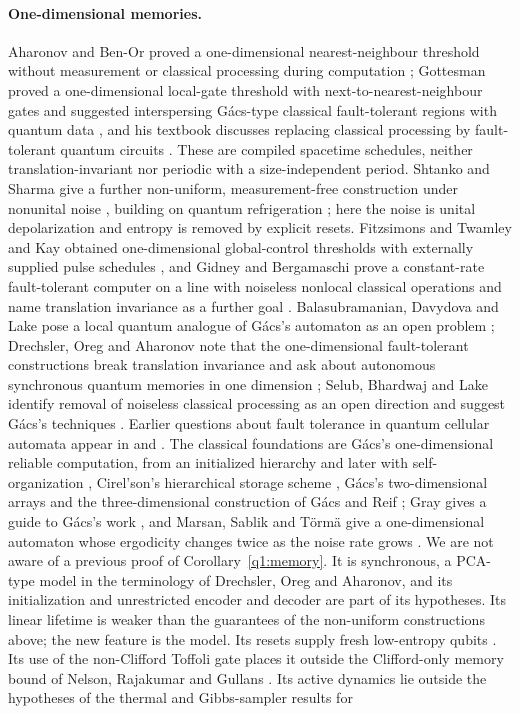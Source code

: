 \paragraph{One-dimensional memories.}
Aharonov and Ben-Or proved a one-dimensional nearest-neighbour threshold without measurement or classical processing during computation \cite[Theorem~13]{ABO2008}; Gottesman proved a one-dimensional local-gate threshold with next-to-nearest-neighbour gates and suggested interspersing G\'acs-type classical fault-tolerant regions with quantum data \cite{Gottesman2000}, and his textbook discusses replacing classical processing by fault-tolerant quantum circuits \cite[Section~15.3.1]{Gottesman2024}. These are compiled spacetime schedules, neither translation-invariant nor periodic with a size-independent period. Shtanko and Sharma give a further non-uniform, measurement-free construction under nonunital noise \cite{SS2025}, building on quantum refrigeration \cite{BGH2013}; here the noise is unital depolarization and entropy is removed by explicit resets. Fitzsimons and Twamley and Kay obtained one-dimensional global-control thresholds with externally supplied pulse schedules \cite{FT2007,Kay2007,Kay2005}, and Gidney and Bergamaschi prove a constant-rate fault-tolerant computer on a line with noiseless nonlocal classical operations and name translation invariance as a further goal \cite{GB2025}. Balasubramanian, Davydova and Lake pose a local quantum analogue of G\'acs's automaton as an open problem \cite{BDL2026}; Drechsler, Oreg and Aharonov note that the one-dimensional fault-tolerant constructions break translation invariance and ask about autonomous synchronous quantum memories in one dimension \cite[Sections~1.2 and~1.8]{DOA2026}; Selub, Bhardwaj and Lake identify removal of noiseless classical processing as an open direction and suggest G\'acs's techniques \cite[Section~1.3]{SBL2026}. Earlier questions about fault tolerance in quantum cellular automata appear in \cite[Section~IV]{Kay2007} and \cite[Section~10.1.2]{PerezDelgado2007}. The classical foundations are G\'acs's one-dimensional reliable computation, from an initialized hierarchy \cite{Gacs1986} and later with self-organization \cite{Gacs2001}, Cirel'son's hierarchical storage scheme \cite{Cirelson1978}, G\'acs's two-dimensional arrays \cite{Gacs1989} and the three-dimensional construction of G\'acs and Reif \cite{GacsReif1988}; Gray gives a guide to G\'acs's work \cite{Gray2001}, and Marsan, Sablik and T\"orm\"a give a one-dimensional automaton whose ergodicity changes twice as the noise rate grows \cite{Marsan2025}. We are not aware of a previous proof of Corollary~\ref{q1:memory}. It is synchronous, a PCA-type model in the terminology of Drechsler, Oreg and Aharonov, and its initialization and unrestricted encoder and decoder are part of its hypotheses. Its linear lifetime is weaker than the guarantees of the non-uniform constructions above; the new feature is the model. Its resets supply fresh low-entropy qubits \cite{ABIN1996}. Its use of the non-Clifford Toffoli gate places it outside the Clifford-only memory bound of Nelson, Rajakumar and Gullans \cite{NRG2026}. Its active dynamics lie outside the hypotheses of the thermal and Gibbs-sampler results for 